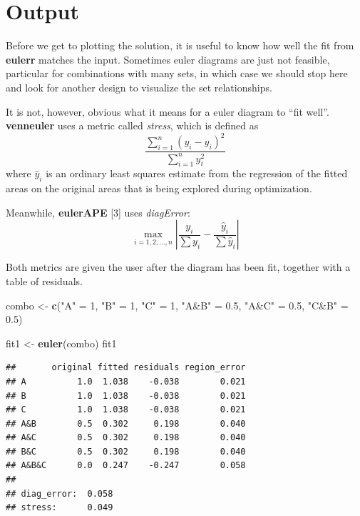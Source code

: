 \documentclass[
  headsepline=true,headings=standardclasses%
]{scrartcl}
\newenvironment{Shaded}{\begin{snugshade}}{\end{snugshade}}
\newcommand{\KeywordTok}[1]{\textcolor[rgb]{0.13,0.29,0.53}{\textbf{#1}}}
\newcommand{\DecValTok}[1]{\textcolor[rgb]{0.00,0.00,0.81}{#1}}
\newcommand{\FloatTok}[1]{\textcolor[rgb]{0.00,0.00,0.81}{#1}}
\newcommand{\StringTok}[1]{\textcolor[rgb]{0.31,0.60,0.02}{#1}}
\newcommand{\NormalTok}[1]{#1}
\theoremstyle{definition}
\theoremstyle{definition}
\theoremstyle{remark}
\begin{document}
\section{Output}\label{output}

Before we get to plotting the solution, it is useful to know how well
the fit from \textbf{eulerr} matches the input. Sometimes euler diagrams
are just not feasible, particular for combinations with many sets, in
which case we should stop here and look for another design to visualize
the set relationships.

It is not, however, obvious what it means for a euler diagram to ``fit
well''. \textbf{venneuler} uses a metric called \emph{stress}, which is
defined as \[
\frac{\sum_{i=1}^{n} (y_i - \hat{y}_i) ^ 2}{\sum_{i=1}^{n} y_i ^ 2}
\] where \(\hat{y}_i\) is an ordinary least squares estimate from the
regression of the fitted areas on the original areas that is being
explored during optimization.

Meanwhile, \textbf{eulerAPE} {[}3{]} uses \emph{diagError}: \[
\max_{i = 1, 2, \dots, n} \left| \frac{y_i}{\sum y_i} -
  \frac{\hat{y}_i}{\sum \hat{y}_i} \right|
\]

Both metrics are given the user after the diagram has been fit, together
with a table of residuals.

\begin{Shaded}
\begin{Highlighting}[]
\NormalTok{combo <-}\StringTok{ }\KeywordTok{c}\NormalTok{(}\StringTok{"A"}\NormalTok{ =}\StringTok{ }\DecValTok{1}\NormalTok{, }\StringTok{"B"}\NormalTok{ =}\StringTok{ }\DecValTok{1}\NormalTok{, }\StringTok{"C"}\NormalTok{ =}\StringTok{ }\DecValTok{1}\NormalTok{,}
           \StringTok{"A&B"}\NormalTok{ =}\StringTok{ }\FloatTok{0.5}\NormalTok{, }\StringTok{"A&C"}\NormalTok{ =}\StringTok{ }\FloatTok{0.5}\NormalTok{, }\StringTok{"C&B"}\NormalTok{ =}\StringTok{ }\FloatTok{0.5}\NormalTok{)}

\NormalTok{fit1 <-}\StringTok{ }\KeywordTok{euler}\NormalTok{(combo)}
\NormalTok{fit1}
\end{Highlighting}
\end{Shaded}

\begin{verbatim}
##       original fitted residuals region_error
## A          1.0  1.038    -0.038        0.021
## B          1.0  1.038    -0.038        0.021
## C          1.0  1.038    -0.038        0.021
## A&B        0.5  0.302     0.198        0.040
## A&C        0.5  0.302     0.198        0.040
## B&C        0.5  0.302     0.198        0.040
## A&B&C      0.0  0.247    -0.247        0.058
## 
## diag_error:  0.058 
## stress:      0.049
\end{verbatim}
\end{document}

